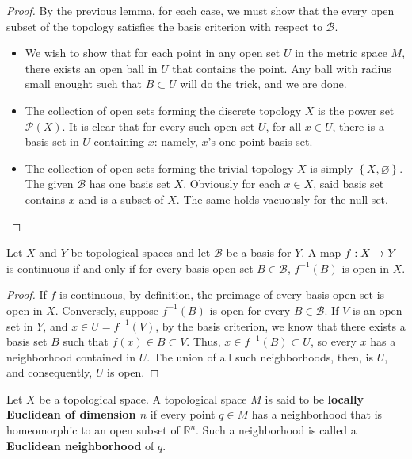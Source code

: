 \documentclass{mathnotes}
\begin{document}
\begin{proof}
    By the previous lemma, for each case, we must show that the every open subset of the topology satisfies the basis criterion with
    respect to $\mathcal{B}$.
    \begin{itemize}
        \item We wish to show that for each point in any open set $U$ in the metric space $M$, there exists an open ball in $U$
            that contains the point. Any ball with radius small enought such that $B\subset U$ will do the trick, and we are done.
        \item The collection of open sets forming the discrete topology $X$ is the power set $\mathcal{P}(X)$. It is clear that for every
            such open set $U$, for all $x\in U$, there is a basis set in $U$ containing $x$: namely, $x$'s one-point basis set.
        \item The collection of open sets forming the trivial topology $X$ is simply $\left\{ X,\varnothing \right\}$. The given $\mathcal{B}$
            has one basis set $X$. Obviously for each $x\in X$, said basis set contains $x$ and is a subset of $X$. The same holds
            vacuously for the null set.
    \end{itemize}
\end{proof}


\begin{lem}
    Let $X$ and $Y$ be topological spaces and let $\mathcal{B}$ be a basis for $Y$. A map $f:X\rightarrow Y$ is continuous if and only if for every
    basis open set $B\in\mathcal{B}$, $f^{-1}(B)$ is open in $X$.
\end{lem}

\begin{proof}
    If $f$ is continuous, by definition, the preimage of every basis open set is open in $X$. Conversely, suppose $f^{-1}(B)$ is open for every
    $B\in\mathcal{B}$. If $V$ is an open set in $Y$, and $x\in U=f^{-1}(V)$, by the basis criterion, we know that there exists a basis set $B$
    such that $f(x)\in B\subset V$. Thus, $x\in f^{-1}(B)\subset U$, so every $x$ has a neighborhood contained in $U$. The union of all such
    neighborhoods, then, is $U$, and consequently, $U$ is open.
\end{proof}

\begin{defn}
    Let $X$ be a topological space. A topological space $M$ is said to be \textbf{locally Euclidean of dimension $n$} if every point $q\in M$
    has a neighborhood that is homeomorphic to an open subset of $\mathbb{R}^n$. Such a neighborhood is called a \textbf{Euclidean neighborhood}
    of $q$.
\end{defn}
\end{document}
